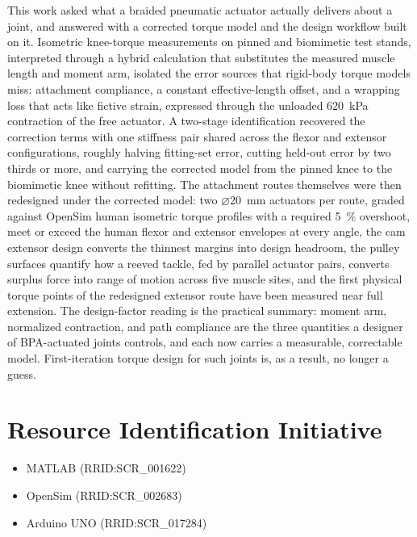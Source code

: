 \documentclass[utf8]{FrontiersinHarvard} %
\begin{document}
This work asked what a braided pneumatic actuator actually delivers about a joint, and answered with a corrected torque model and the design workflow built on it. Isometric knee-torque measurements on pinned and biomimetic test stands, interpreted through a hybrid calculation that substitutes the measured muscle length and moment arm, isolated the error sources that rigid-body torque models miss: attachment compliance, a constant effective-length offset, and a wrapping loss that acts like fictive strain, expressed through the unloaded \qty{620}{\kPa} contraction of the free actuator. A two-stage identification recovered the correction terms with one stiffness pair shared across the flexor and extensor configurations, roughly halving fitting-set error, cutting held-out error by two thirds or more, and carrying the corrected model from the pinned knee to the biomimetic knee without refitting. The attachment routes themselves were then redesigned under the corrected model: two $\diameter$\qty{20}{\mm} actuators per route, graded against OpenSim human isometric torque profiles with a required \qty{5}{\percent} overshoot, meet or exceed the human flexor and extensor envelopes at every angle, the cam extensor design converts the thinnest margins into design headroom, the pulley surfaces quantify how a reeved tackle, fed by parallel actuator pairs, converts surplus force into range of motion across five muscle sites, and the first physical torque points of the redesigned extensor route have been measured near full extension. The design-factor reading is the practical summary: moment arm, normalized contraction, and path compliance are the three quantities a designer of BPA-actuated joints controls, and each now carries a measurable, correctable model. First-iteration torque design for such joints is, as a result, no longer a guess.

\section*{Resource Identification Initiative}
\begin{itemize}
    \item MATLAB (RRID:SCR\_001622)
    \item OpenSim (RRID:SCR\_002683)
    \item Arduino UNO (RRID:SCR\_017284)
\end{itemize}

\end{document}
